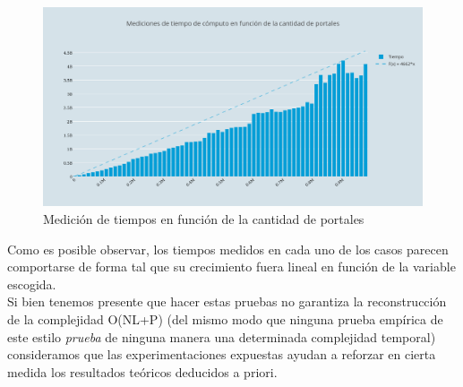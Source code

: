 \begin{figure}[h!]
   \begin{center}
 	\includegraphics[width=18cm]{imagenes/ej2/f(portales).png}
	\caption{Medición de tiempos en función de la cantidad de portales}
	\label{portales}
   \end{center}
 \end{figure}


Como es posible observar, los tiempos medidos en cada uno de los casos parecen comportarse de forma tal que su crecimiento fuera lineal en función de la variable escogida.\\

Si bien tenemos presente que hacer estas pruebas no garantiza la reconstrucción de la complejidad O(NL+P) (del mismo modo que ninguna prueba empírica de este estilo \textit{prueba} de ninguna manera una determinada complejidad temporal) consideramos que las experimentaciones expuestas ayudan a reforzar en cierta medida los resultados teóricos deducidos a priori. \\



\newpage
